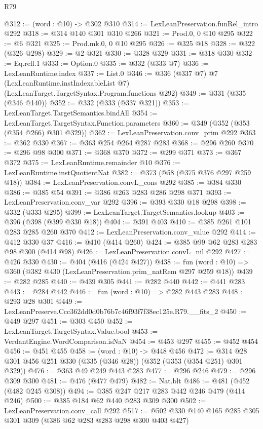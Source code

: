 \begin{lexlean}{R79}
\begin{coremodule}
@312 := (word : @10) -> @302 @310
@314 := LexLeanPreservation.funRel_intro @292
@318 := @314 @140 @301 @310 @266
@321 := Prod.{0, 0} @10 @295
@322 := @6 @321
@325 := Prod.mk.{0, 0} @10 @295
@326 := @325 @18
@328 := @322 (@326 @298)
@329 := @2 @321
@330 := @328 @329
@331 := @318 @330
@332 := Eq.refl.{1}
@333 := Option.{0}
@335 := @332 (@333 @7)
@336 := LexLeanRuntime.index
@337 := List.{0}
@346 := @336
    (@337 @7)
    @7
    (LexLeanRuntime.instIndexableList @7)
    (LexLeanTarget.TargetSyntax.Program.functions @292)
@349 := @331 (@335 (@346 @140))
@352 := @332 (@333 (@337 @321))
@353 := LexLeanTarget.TargetSemantics.bindAll
@354 := LexLeanTarget.TargetSyntax.Function.parameters
@360 := @349 (@352 (@353 (@354 @266) @301 @329))
@362 := LexLeanPreservation.conv_prim @292
@363 := @362 @330
@367 := @363 @254 @264 @287 @283
@368 := @296 @260
@370 := @296 @98 @300
@371 := @368 @370
@372 := @299 @371
@373 := @367 @372
@375 := LexLeanRuntime.remainder @10
@376 := LexLeanRuntime.instQuotientNat
@382 := @373 (@58 (@375 @376 @297 @259 @18))
@384 := LexLeanPreservation.convL_cons @292
@385 := @384 @330
@386 := @385 @54
@391 := @386 @263 @283 @286 @298 @371
@393 := LexLeanPreservation.conv_var @292
@396 := @393 @330 @18 @298
@398 := @332 (@333 @295)
@399 := LexLeanTarget.TargetSemantics.lookup
@403 := @396 (@398 (@399 @330 @18))
@404 := @391 @403
@410 := @385 @261 @101 @283 @285 @260 @370
@412 := LexLeanPreservation.conv_value @292
@414 := @412 @330 @37
@416 := @410 (@414 @260)
@424 := @385 @99 @62 @283 @283 @98 @300 (@414 @98)
@426 := LexLeanPreservation.convL_nil @292
@427 := @426 @330
@430 := @404 (@416 (@424 @427))
@438 := fun (word : @10) => @360 (@382 @430 (LexLeanPreservation.prim_natRem @297 @259 @18))
@439 := @282 @285
@440 := @439 @305
@441 := @282 @440
@442 := @441 @283
@443 := @284 @442
@446 := fun (word : @10) => @282 @443 @283
@448 := @293 @28 @301
@449 := LexLeanPreserve.Ccc362dd0d0b76b7c46f93f7f38ec125e.R79.__fits_2
@450 := @449 @297
@451 := @303 @450
@452 := LexLeanTarget.TargetSyntax.Value.bool
@453 := VerdantEngine.WordComparison.isNaN
@454 := @453 @297
@455 := @452 @454
@456 := @451 @455
@458 := (word : @10) -> @448 @456
@472 := @314 @28 @301 @456 @251 @330 (@335 (@346 @28)) (@352 (@353 (@354 @251) @301 @329))
@476 := @363 @49 @249 @443 @283
@477 := @296 @246
@479 := @296 @309 @300
@481 := @476 (@477 @479)
@482 := Nat.blt
@486 := @481 (@452 (@482 @245 @308))
@494 := @385 @247 @217 @283 @442 @246 @479 (@414 @246)
@500 := @385 @184 @62 @440 @283 @309 @300
@502 := LexLeanPreservation.conv_call @292
@517 := @502 @330 @140 @165 @285 @305 @301 @309 (@386 @62 @283 @283 @298 @300 @403 @427)

\end{coremodule}
\end{lexlean}
